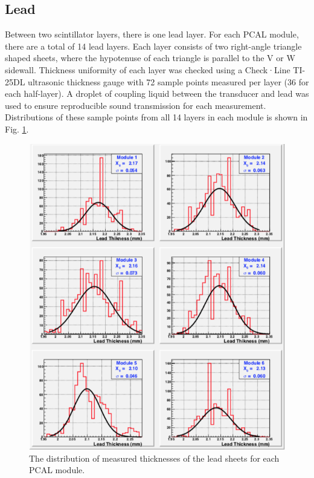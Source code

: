 \subsection{Lead}

Between two scintillator layers, there is one lead layer. For each PCAL module, there are a total of 14 lead layers. Each layer consists of two right-angle triangle shaped sheets, where the hypotenuse of each triangle is parallel to the V or W sidewall. Thickness uniformity of each layer was checked using a Check·Line TI-25DL ultrasonic thickness gauge with 72 sample points measured per layer (36 for each half-layer).  A droplet of coupling liquid between the transducer and lead was used to  ensure reproducible sound transmission for each measurement.  Distributions of these sample points from all 14 layers in each module is shown in Fig. \ref{fig:S4_5}.

\begin{figure}[hbt]
\centering
\includegraphics[width=0.95\columnwidth,keepaspectratio]{img/S4_5.png}
\caption{The distribution of measured thicknesses of the lead sheets for each PCAL module.}
\label{fig:S4_5}
\end{figure}


